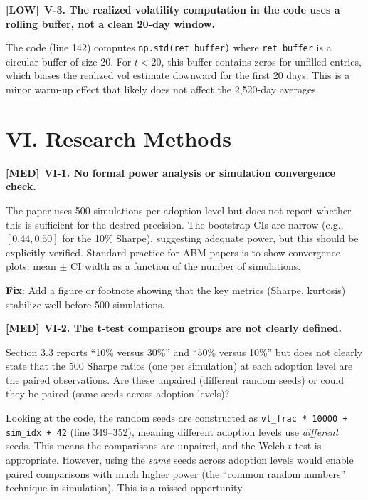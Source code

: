 \documentclass[12pt,a4paper]{article}
\newcommand{\MED}{\textbf{\textcolor{warncolor}{[MED]}}}
\newcommand{\LOW}{\textbf{\textcolor{okgreen}{[LOW]}}}
\begin{document}
\medskip

\LOW\ \textbf{V-3. The realized volatility computation in the code uses a rolling buffer, not a clean 20-day window.}

The code (line 142) computes \texttt{np.std(ret\_buffer)} where \texttt{ret\_buffer} is a circular buffer of size 20. For $t < 20$, this buffer contains zeros for unfilled entries, which biases the realized vol estimate downward for the first 20 days. This is a minor warm-up effect that likely does not affect the 2,520-day averages.


\section*{VI. Research Methods}

\MED\ \textbf{VI-1. No formal power analysis or simulation convergence check.}

The paper uses 500 simulations per adoption level but does not report whether this is sufficient for the desired precision. The bootstrap CIs are narrow (e.g., $[0.44, 0.50]$ for the 10\% Sharpe), suggesting adequate power, but this should be explicitly verified. Standard practice for ABM papers is to show convergence plots: mean $\pm$ CI width as a function of the number of simulations.

\textbf{Fix}: Add a figure or footnote showing that the key metrics (Sharpe, kurtosis) stabilize well before 500 simulations.

\medskip

\MED\ \textbf{VI-2. The t-test comparison groups are not clearly defined.}

Section 3.3 reports ``10\% versus 30\%'' and ``50\% versus 10\%'' but does not clearly state that the 500 Sharpe ratios (one per simulation) at each adoption level are the paired observations. Are these unpaired (different random seeds) or could they be paired (same seeds across adoption levels)?

Looking at the code, the random seeds are constructed as \texttt{vt\_frac * 10000 + sim\_idx + 42} (line 349--352), meaning different adoption levels use \emph{different} seeds. This means the comparisons are unpaired, and the Welch $t$-test is appropriate. However, using the \emph{same} seeds across adoption levels would enable paired comparisons with much higher power (the ``common random numbers'' technique in simulation). This is a missed opportunity.
\end{document}
